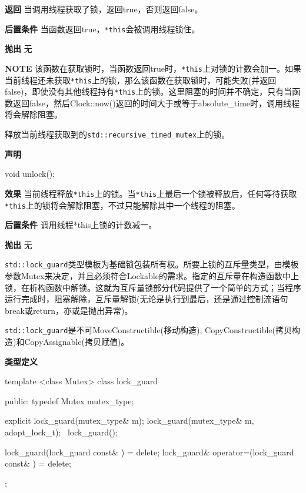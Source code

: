 \textbf{返回}
当调用线程获取了锁，返回true，否则返回false。

\textbf{后置条件}
当函数返回true，\texttt{*this}会被调用线程锁住。

\textbf{抛出}
无

\textbf{NOTE} 该函数在获取锁时，当函数返回true时，\texttt{*this}上对锁的计数会加一。如果当前线程还未获取\texttt{*this}上的锁，那么该函数在获取锁时，可能失败(并返回false)，即使没有其他线程持有\texttt{*this}上的锁。这里阻塞的时间并不确定，只有当函数返回false，然后Clock::now()返回的时间大于或等于absolute\_time时，调用线程将会解除阻塞。


释放当前线程获取到的\texttt{std::recursive\_timed\_mutex}上的锁。

\textbf{声明}

\begin{cpp}
void unlock();
\end{cpp}

\textbf{效果}
当前线程释放\texttt{*this}上的锁。当\texttt{*this}上最后一个锁被释放后，任何等待获取\texttt{*this}上的锁将会解除阻塞，不过只能解除其中一个线程的阻塞。

\textbf{后置条件}
调用线程*this上锁的计数减一。

\textbf{抛出}
无


\texttt{std::lock\_guard}类型模板为基础锁包装所有权。所要上锁的互斥量类型，由模板参数Mutex来决定，并且必须符合Lockable的需求。指定的互斥量在构造函数中上锁，在析构函数中解锁。这就为互斥量锁部分代码提供了一个简单的方式；当程序运行完成时，阻塞解除，互斥量解锁(无论是执行到最后，还是通过控制流语句break或return，亦或是抛出异常)。

\texttt{std::lock\_guard}是不可MoveConstructible(移动构造), CopyConstructible(拷贝构造)和CopyAssignable(拷贝赋值)。

\textbf{类型定义}

\begin{cpp}
template <class Mutex>
class lock_guard
{
public:
  typedef Mutex mutex_type;

  explicit lock_guard(mutex_type& m);
  lock_guard(mutex_type& m, adopt_lock_t);
  ~lock_guard();

  lock_guard(lock_guard const& ) = delete;
  lock_guard& operator=(lock_guard const& ) = delete;
};
\end{cpp}


